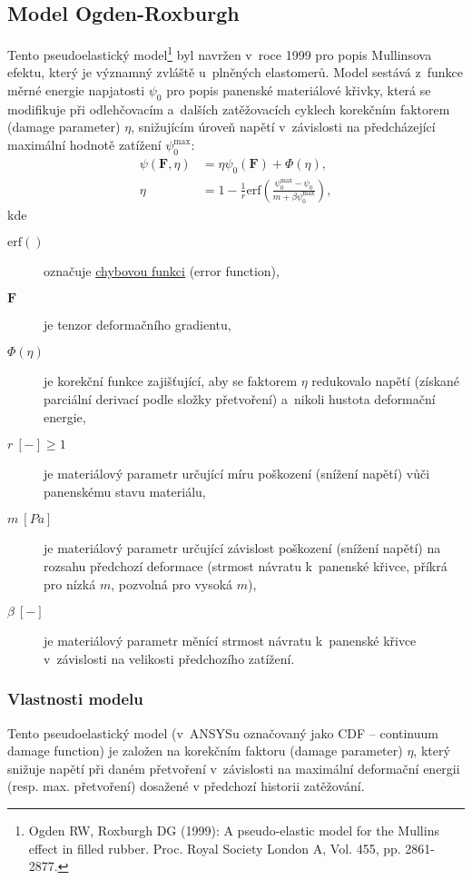 
\subsection{Model Ogden-Roxburgh}\label{sec:ogden-roxburgh}
Tento pseudoelastický model\footnote{Ogden RW, Roxburgh DG (1999): A pseudo-elastic model for the Mullins effect in filled rubber. Proc. Royal Society London A, Vol. 455, pp. 2861-2877.} byl navržen v~roce 1999 pro popis Mullinsova efektu, který je významný zvláště u~plněných elastomerů.
Model sestává z~funkce měrné energie napjatosti $\psi_0$ pro popis panenské materiálové křivky, která se modifikuje při odlehčovacím a~dalších zatěžovacích cyklech korekčním faktorem (damage parameter) $\eta$, snižujícím úroveň napětí v~závislosti na předcházející maximální hodnotě zatížení $\psi_0^\text{max}$:
\begin{align}
	\psi(\bm{F}, \eta) &= \eta \psi_0(\bm{F}) + \varPhi(\eta),\\
	\eta &= 1 - \frac{1}{r} \mathrm{erf}\left( \frac{\psi_0^\text{max} - \psi_0}{m + \beta \psi_0^\text{max}} \right),
\end{align}
kde
\begin{description}
	\item[$\mathrm{erf}()$] označuje \hyperref[sec:chybova-funkce]{chybovou funkci} (error function),
	\item[$\bm{F}$] je tenzor deformačního gradientu,
	\item[$\varPhi(\eta)$] je korekční funkce zajišťující, aby se faktorem $\eta$ redukovalo napětí (získané parciální derivací podle složky přetvoření) a~nikoli hustota deformační energie,
	\item[{$r\:[-] \geq 1$}] je materiálový parametr určující míru poškození (snížení napětí) vůči panenskému stavu  materiálu,
	\item[{$m\:[Pa]$}] je materiálový parametr určující závislost poškození (snížení napětí) na rozsahu předchozí deformace (strmost návratu k~panenské křivce, příkrá pro nízká $m$, pozvolná pro vysoká $m$),
	\item[{$\beta\:[-]$}] je materiálový parametr měnící strmost návratu k~panenské křivce v~závislosti na velikosti předchozího zatížení.
\end{description}

\subsubsection{Vlastnosti modelu}
Tento pseudoelastický model (v~ANSYSu označovaný jako CDF -- continuum damage function) je založen na korekčním faktoru (damage parameter) $\eta$, který snižuje napětí při daném přetvoření v~závislosti na maximální deformační energii (resp. max. přetvoření) dosažené v předchozí historii zatěžování.

